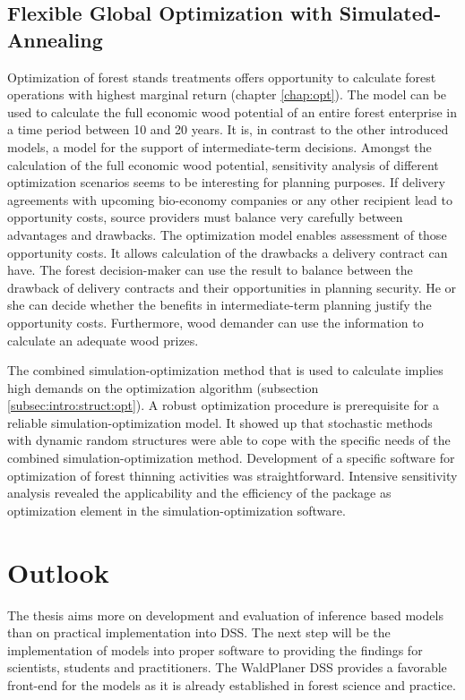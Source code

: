\subsection{Flexible Global Optimization with Simulated-Annealing}
\label{subsec:discussion:struct:opt}
Optimization of forest stands treatments offers opportunity to calculate forest operations with highest marginal return (chapter \ref{chap:opt}). The model can be used to calculate the full economic wood potential of an entire forest enterprise in a time period between 10 and 20 years. It is, in contrast to the other introduced models, a model for the support of intermediate-term decisions. Amongst the calculation of the full economic wood potential, sensitivity analysis of different optimization scenarios seems to be interesting for planning purposes. If delivery agreements with upcoming bio-economy companies or any other recipient lead to opportunity costs, source providers must balance very carefully between advantages and drawbacks. The optimization model enables assessment of those opportunity costs. It allows calculation of the drawbacks a delivery contract can have. The forest decision-maker can use the result to balance between the drawback of delivery contracts and their opportunities in planning security. He or she can decide whether the benefits in intermediate-term planning justify the opportunity costs. Furthermore, wood demander can use the information to calculate an adequate wood prizes.

The combined simulation-optimization method that is used to calculate implies high demands on the optimization algorithm (subsection \ref{subsec:intro:struct:opt}). A robust optimization procedure is prerequisite for a reliable simulation-optimization model. It showed up that stochastic methods with dynamic random structures were able to cope with the specific needs of the combined simulation-optimization method. Development of a specific software for optimization of forest thinning activities was straightforward. Intensive  sensitivity analysis revealed the applicability and the efficiency of the package as optimization element in the simulation-optimization software.

\section{Outlook}
\label{sec:discussion:outlook}
The thesis aims more on development and evaluation of inference based models than on practical implementation into DSS. The next step will be the implementation of models into proper software to providing the findings for scientists, students and practitioners. The WaldPlaner DSS provides a favorable front-end for the models as it is already established in forest science and practice.

